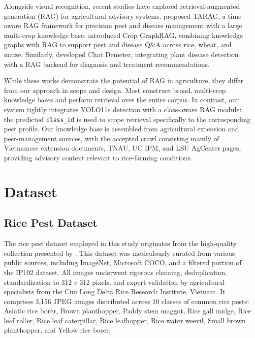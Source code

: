 ﻿\documentclass[11pt]{article}
\begin{document}
Alongside visual recognition, recent studies have explored retrieval-augmented generation (RAG) for agricultural advisory systems. \citet{liu2026tarag} proposed TARAG, a time-aware RAG framework for precision pest and disease management with a large multi-crop knowledge base. \citet{wu2026cropgraphrag} introduced Crop GraphRAG, combining knowledge graphs with RAG to support pest and disease Q\&A across rice, wheat, and maize. Similarly, \citet{zhang2026demeter} developed Chat Demeter, integrating plant disease detection with a RAG backend for diagnosis and treatment recommendations.

While these works demonstrate the potential of RAG in agriculture, they differ from our approach in scope and design. Most construct broad, multi-crop knowledge bases and perform retrieval over the entire corpus. In contrast, our system tightly integrates YOLO11s detection with a class-aware RAG module: the predicted \texttt{class\_id} is used to scope retrieval specifically to the corresponding pest profile. Our knowledge base is assembled from agricultural extension and pest-management sources, with the accepted crawl consisting mainly of Vietnamese extension documents, TNAU, UC IPM, and LSU AgCenter pages, providing advisory content relevant to rice-farming conditions.

\section{Dataset}
\label{sec:dataset}

\subsection{Rice Pest Dataset}

The rice pest dataset employed in this study originates from the high-quality collection presented by \citet{quach2024rice}. This dataset was meticulously curated from various public sources, including ImageNet, Microsoft COCO, and a filtered portion of the IP102 dataset. All images underwent rigorous cleaning, deduplication, standardization to $312 \times 312$ pixels, and expert validation by agricultural specialists from the Cuu Long Delta Rice Research Institute, Vietnam. It comprises 3,156 JPEG images distributed across 10 classes of common rice pests: Asiatic rice borer, Brown planthopper, Paddy stem maggot, Rice gall midge, Rice leaf roller, Rice leaf caterpillar, Rice leafhopper, Rice water weevil, Small brown planthopper, and Yellow rice borer.
\end{document}
